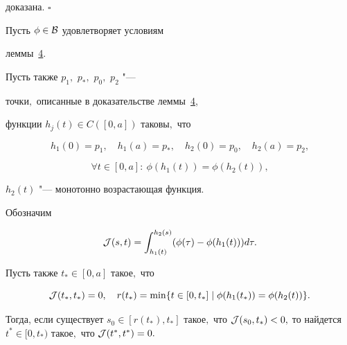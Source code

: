 доказана. \hfill $\square$ %



\smallskip



\hypertarget{palin:lemma6}{}



\begin{lemma}Пусть $\phi\in{\cal B}$ удовлетворяет условиям 

леммы~{\rm\hyperlink{palin:lemma4}{4}.}

Пусть также $p_1,$ $p_*,$ $p_0,$ $p_2$ "---

точки$,$ описанные в доказательстве леммы~{\rm\hyperlink{palin:lemma4}{4},}

функции $h_j(t)\in C([0,a])$ таковы$,$ что

$$

h_1(0)=p_1,\quad h_1(a)=p_*,\quad h_2(0)=p_0,\quad h_2(a)=p_2,

$$

$$

\forall t\in[0,a]:~\phi(h_1(t))=\phi(h_2(t)),

$$

$h_2(t)$ "--- монотонно возрастающая функция$.$ 



Обозначим

\begin{gather}

{\cal

J}(s,t)=\int _{h_1(t)}^{h_2(s)}(\phi(\tau)-\phi(h_1(t)))d\tau.\label{eq-Jst-defi}

\end{gather}

Пусть также $t_*\in[0,a]$ такое$,$ что 

$${\cal J}(t_*,t_*)=0,\quad r(t_*)=\min\{t\in[0,t_*]\mid\phi(h_1(t_*))=\phi(h_2(t))\}.$$ 



Тогда, если существует $s_0\in[r(t_*),t_*]$ такое$,$ что ${\cal

J}(s_0,t_*)<0,$ то найдется $t^*\in[0,t_*)$ такое$,$ что ${\cal J}(t^*,t^*)=0.$

\end{lemma}



\smallskip



